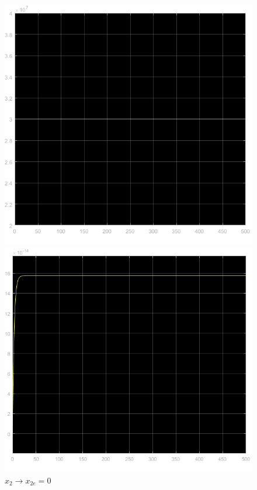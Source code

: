 \documentclass{article}
\begin{document}
\begin{figure}[!h]
   \begin{minipage}{0.5\textwidth}
     \centering
     \includegraphics[width=1.03\textwidth]{grafici/x1_1.png}
     \caption*{$x_1\longrightarrow x_{1e}=3\cdot10^7$}
   \end{minipage}\hfill
    \begin{minipage}{0.5\textwidth}
     \centering
     \includegraphics[width=1.1\textwidth]{grafici/x2_1.png}
     \caption*{$x_2\longrightarrow x_{2e}=0$}
   \end{minipage}\hfill
\end{figure}
\end{document}
